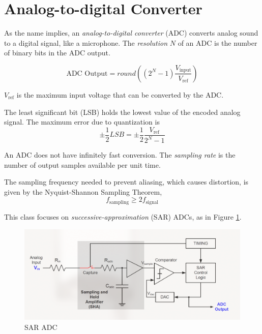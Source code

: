 \section{Analog-to-digital Converter}

As the name implies, an \emph{analog-to-digital converter}
(ADC) converts analog sound to a digital signal, like a
microphone.
The \emph{resolution} $N$ of an ADC is the number of binary bits
in the ADC output.

\begin{equation}
    \text{ADC Output} = round\left( (2^N - 1)\frac{V_{\text{input}}}{V_{\text{ref}}} \right)
\end{equation}

$V_{\text{ref}}$ is the maximum input voltage that can be converted by the ADC.

The least significant bit (LSB) holds the lowest value of the encoded
analog signal.
The maximum error due to quantization is
\begin{equation}
    \pm \frac{1}{2}LSB = \pm \frac{1}{2} \frac{V_\text{ref}}{2^N-1}
\end{equation}

An ADC does not have infinitely fast conversion. The \emph{sampling rate}
is the number of output samples available per unit time.

The sampling frequency needed to prevent aliasing, which causes distortion,
is given by the Nyquist-Shannon Sampling Theorem,
\begin{equation}
    f_{\text{sampling}} \geq 2f_{\text{signal}}
\end{equation}

This class focuses on \emph{successive-approximation} (SAR) ADCs,
as in Figure \ref{fig:saradc}.

\begin{figure}
    \includegraphics{images/saradc.png}
    \caption{SAR ADC}
    \label{fig:saradc}
\end{figure}